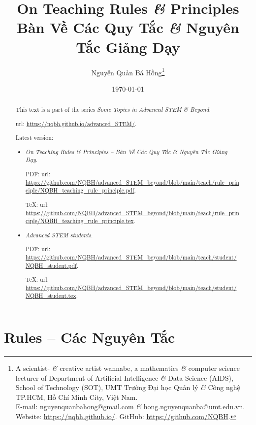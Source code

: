 \documentclass{article}
\title{On Teaching Rules {\it\&} Principles\\Bàn Về Các Quy Tắc {\it\&} Nguyên Tắc Giảng Dạy}
\author{Nguyễn Quản Bá Hồng\footnote{A scientist- {\it\&} creative artist wannabe, a mathematics {\it\&} computer science lecturer of Department of Artificial Intelligence {\it\&} Data Science (AIDS), School of Technology (SOT), UMT Trường Đại học Quản lý {\it\&} Công nghệ TP.HCM, Hồ Chí Minh City, Việt Nam.\\E-mail: {\sf nguyenquanbahong@gmail.com} {\it\&} {\sf hong.nguyenquanba@umt.edu.vn}. Website: \url{https://nqbh.github.io/}. GitHub: \url{https://github.com/NQBH}.}}
\date{\today}
\begin{document}
\maketitle
\begin{abstract}
	This text is a part of the series {\it Some Topics in Advanced STEM \& Beyond}:
	
	{\sc url}: \url{https://nqbh.github.io/advanced_STEM/}.
	
	Latest version:
	\begin{itemize}
		\item {\it On Teaching Rules \& Principles -- Bàn Về Các Quy Tắc \& Nguyên Tắc Giảng Dạy}.
		
		PDF: {\sc url}: \url{https://github.com/NQBH/advanced_STEM_beyond/blob/main/teach/rule_principle/NQBH_teaching_rule_principle.pdf}.
		
		\TeX: {\sc url}: \url{https://github.com/NQBH/advanced_STEM_beyond/blob/main/teach/rule_principle/NQBH_teaching_rule_principle.tex}.
		\item {\it Advanced STEM students}.
		
		PDF: {\sc url}: \url{https://github.com/NQBH/advanced_STEM_beyond/blob/main/teach/student/NQBH_student.pdf}.
		
		\TeX: {\sc url}: \url{https://github.com/NQBH/advanced_STEM_beyond/blob/main/teach/student/NQBH_student.tex}.
	\end{itemize}
\end{abstract}
\tableofcontents


\section{Rules -- Các Nguyên Tắc}
\end{document}
